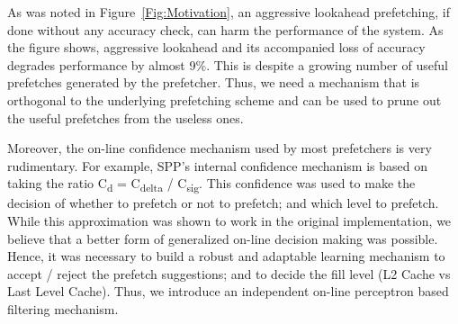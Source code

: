 

As was noted in Figure~\ref{Fig:Motivation}, an aggressive lookahead
prefetching, if done without any accuracy check, can harm the
performance of the system. As the figure shows, aggressive lookahead
and its accompanied loss of accuracy degrades performance by almost
9\%.  This is despite a growing number of useful prefetches generated
by the prefetcher.  Thus, we need a mechanism that is orthogonal to
the underlying prefetching scheme and can be used to prune out the
useful prefetches from the useless ones.

Moreover, the on-line confidence mechanism used by most prefetchers is
very rudimentary. For example, SPP's internal confidence mechanism is
based on taking the ratio C\textsubscript{d} = C\textsubscript{delta}
/ C\textsubscript{sig}. This confidence was used to make the decision
of whether to prefetch or not to prefetch; and which level to
prefetch.  While this approximation was shown to work in the original
implementation, we believe that a better form of generalized on-line
decision making was possible. Hence, it was necessary to build a
robust and adaptable learning mechanism to accept / reject the
prefetch suggestions; and to decide the fill level (L2 Cache vs Last
Level Cache). Thus, we introduce an independent on-line perceptron
based filtering mechanism.


